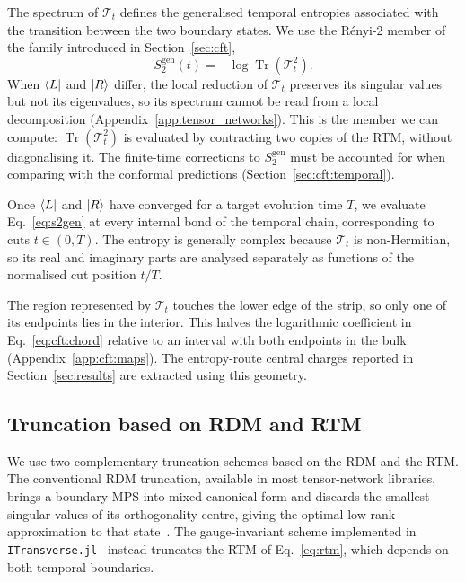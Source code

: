 The spectrum of $\mathcal{T}_t$ defines the generalised temporal entropies associated with the transition between the two boundary states. We use the R\'enyi-2 member of the family introduced in Section~\ref{sec:cft},
\begin{equation}
  S_{2}^{\mathrm{gen}}(t) = -\log \operatorname{Tr}\left(\mathcal{T}_t^2\right).
  \label{eq:s2gen}
\end{equation}
When $\bra{L}$ and $\ket{R}$ differ, the local reduction of $\mathcal{T}_t$ preserves its singular values but not its eigenvalues, so its spectrum cannot be read from a local decomposition (Appendix~\ref{app:tensor_networks}). This is the member we can compute: $\operatorname{Tr}(\mathcal{T}_t^2)$ is evaluated by contracting two copies of the \ac{RTM}, without diagonalising it. The finite-time corrections to $S_2^{\mathrm{gen}}$ must be accounted for when comparing with the conformal predictions (Section~\ref{sec:cft:temporal}).

Once $\bra{L}$ and $\ket{R}$ have converged for a target evolution time $T$, we evaluate Eq.~\eqref{eq:s2gen} at every internal bond of the temporal chain, corresponding to cuts $t\in(0,T)$. The entropy is generally complex because $\mathcal{T}_t$ is non-Hermitian, so its real and imaginary parts are analysed separately as functions of the normalised cut position $t/T$.

The region represented by $\mathcal{T}_t$ touches the lower edge of the strip, so only one of its endpoints lies in the interior. This halves the logarithmic coefficient in Eq.~\eqref{eq:cft:chord} relative to an interval with both endpoints in the bulk (Appendix~\ref{app:cft:maps}). The entropy-route central charges reported in Section~\ref{sec:results} are extracted using this geometry.

\subsection{Truncation based on RDM and RTM}
\label{sec:transverse:truncation}

We use two complementary truncation schemes based on the \ac{RDM} and the \ac{RTM}. The conventional \ac{RDM} truncation, available in most tensor-network libraries, brings a boundary \ac{MPS} into mixed canonical form and discards the smallest singular values of its orthogonality centre, giving the optimal low-rank approximation to that state~\cite{schollwock2011,vidal2003}. The gauge-invariant scheme implemented in \texttt{ITransverse.jl}~\cite{carignano2025itransverse} instead truncates the \ac{RTM} of Eq.~\eqref{eq:rtm}, which depends on both temporal boundaries.

